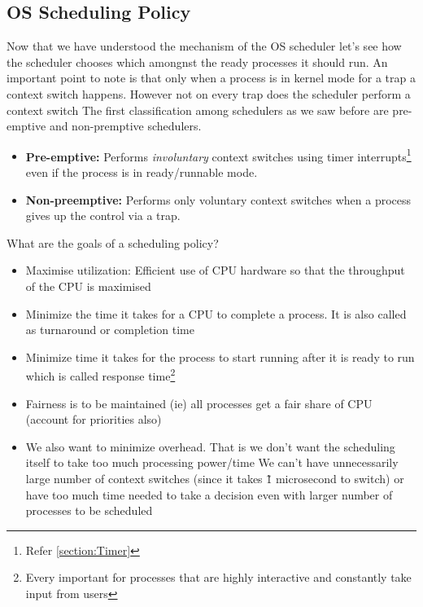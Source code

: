\documentclass[12pt]{article}
\begin{document}
\subsection{OS Scheduling Policy}
Now that we have understood the mechanism of the OS scheduler let's see how the scheduler chooses which amongnst the 
ready processes it should run. An important point to note is that only when a process is in kernel mode for a trap a context switch happens. However not on every trap does the scheduler perform a context switch
The first classification among schedulers as we saw before are pre-emptive and non-premptive schedulers.
\begin{itemize}[topsep=0pt, partopsep=0pt, itemsep=0pt, parsep=0pt]
    \item \textbf{Pre-emptive:} Performs \textit{involuntary} context switches using timer interrupts\footnote{Refer \ref{section:Timer}}
    even if the process is in ready/runnable mode.
    \item \textbf{Non-preemptive:} Performs only voluntary context switches when a process gives up the control via a trap.
\end{itemize}

What are the goals of a scheduling policy?
\begin{itemize}[topsep=0pt, partopsep=0pt, itemsep=0pt, parsep=0pt]
    \item Maximise utilization: Efficient use of CPU hardware so that the throughput of the CPU is maximised
    \item Minimize the time it takes for a CPU to complete a process. It is also called as turnaround or completion time
    \item Minimize time it takes for the process to start running after it is ready to run which is called response time\footnote{Every important for processes that are highly interactive and constantly take input from users}
    \item Fairness is to be maintained (ie) all processes get a fair share of CPU (account for priorities also)
    \item We also want to minimize overhead. That is we don't want the scheduling itself to take too much processing power/time
    We can't have unnecessarily large number of context switches (since it takes \~ 1 microsecond to switch) or have too much time needed to take a decision even with larger number of processes to be scheduled
\end{itemize}
\end{document}
